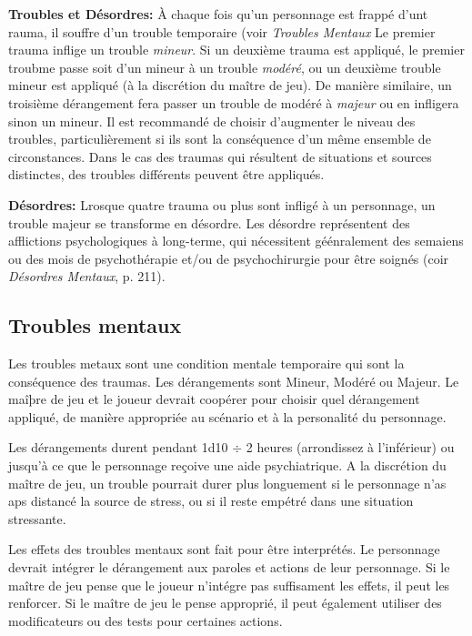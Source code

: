 \textbf{Troubles et Désordres:} À chaque fois qu'un personnage est frappé d'unt rauma, il souffre d'un trouble temporaire (voir \emph{Troubles Mentaux} Le premier trauma inflige un trouble \emph{mineur}. Si un deuxième trauma est appliqué, le premier troubme passe soit d'un mineur à un trouble \emph{modéré}, ou un deuxième trouble mineur est appliqué (à la discrétion du maître de jeu). De manière similaire, un troisième dérangement fera passer un trouble de modéré à \emph{majeur} ou en infligera sinon un mineur. Il est recommandé de choisir d'augmenter le niveau des troubles, particulièrement si ils sont la conséquence d'un même ensemble de circonstances. Dans le cas des traumas qui résultent de situations et sources distinctes, des troubles différents peuvent être appliqués. 

\textbf{Désordres:} Lrosque quatre trauma ou plus sont infligé à un personnage, un trouble majeur se transforme en désordre. Les désordre représentent des afflictions psychologiques à long-terme, qui nécessitent géénralement des semaiens ou des mois de psychothérapie et/ou de psychochirurgie pour être soignés (coir \emph{Désordres Mentaux}, p. 211). 



\subsection {Troubles mentaux} \label{sec:derangements} 

Les troubles metaux sont une condition mentale temporaire qui sont la conséquence des traumas. Les dérangements sont Mineur, Modéré ou Majeur. Le maîþre de jeu et le joueur devrait coopérer pour choisir quel dérangement appliqué, de manière appropriée au scénario et à la personalité du personnage. 

Les dérangements durent pendant 1d10 $\div$ 2 heures (arrondissez à l'inférieur) ou jusqu'à ce que le personnage reçoive une aide psychiatrique. A la discrétion du maître de jeu, un trouble pourrait durer plus longuement si le personnage n'as aps distancé la source de stress, ou si il reste empétré dans une situation stressante. 

Les effets des troubles mentaux sont fait pour être interprétés. Le personnage devrait intégrer le dérangement aux paroles et actions de leur personnage. Si le maître de jeu pense que le joueur n'intégre pas suffisament les effets, il peut les renforcer. Si le maître de jeu le pense approprié, il peut également utiliser des modificateurs ou des tests pour certaines actions. 

